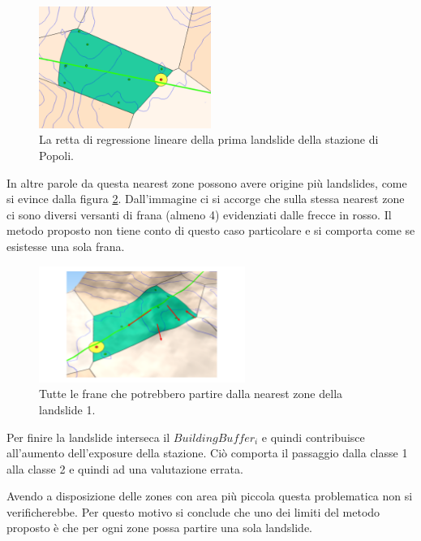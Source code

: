 	\begin{figure}[h]
	\centering
	\includegraphics[width=0.5\textwidth]{images/PopoliRect}
	\caption{La retta di regressione lineare della prima landslide della stazione di Popoli.}
	\label{popolirect}
\end{figure}


In altre parole da questa nearest zone possono avere origine più landslides, come si evince dalla figura \ref{popolimultilandslide}. Dall'immagine ci si accorge che sulla stessa nearest zone ci sono diversi versanti di frana (almeno 4) evidenziati dalle frecce in rosso. Il metodo proposto non tiene conto di questo caso particolare e si comporta come se esistesse una sola frana. 

\begin{figure}[h]
	\centering
	\includegraphics[width=0.6\textwidth]{images/PopoliMultiLandslide}
	\caption{Tutte le frane che potrebbero partire dalla nearest zone della landslide 1.}
	\label{popolimultilandslide}
\end{figure}

Per finire la landslide interseca il $BuildingBuffer_i$ e quindi contribuisce all'aumento dell'exposure della stazione. Ciò comporta il passaggio dalla classe 1 alla classe 2 e quindi ad una valutazione errata.

Avendo a disposizione delle zones con area più piccola questa problematica non si verificherebbe. Per questo motivo si conclude che uno dei limiti del metodo proposto è che per ogni zone possa partire una sola landslide.

